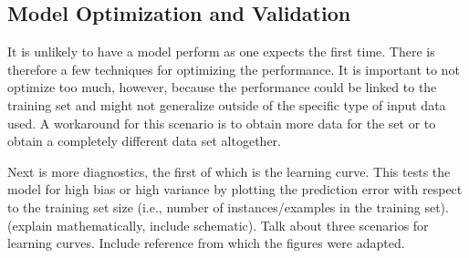 \subsection{Model Optimization and Validation}
\label{sec:optvalid}

It is unlikely to have a model perform as one expects the first time. There is
therefore a few techniques for optimizing the performance. It is important to
not optimize too much, however, because the performance could be linked to the
training set and might not generalize outside of the specific type of input
data used.  A workaround for this scenario is to obtain more data for the set
or to obtain a completely different data set altogether. 

Next is more diagnostics, the first of which is the learning curve. This tests
the model for high bias or high variance by plotting the prediction error with
respect to the training set size (i.e., number of instances/examples in the
training set). (explain mathematically, include schematic). Talk about three
scenarios for learning curves. Include reference from which the figures were
adapted.

